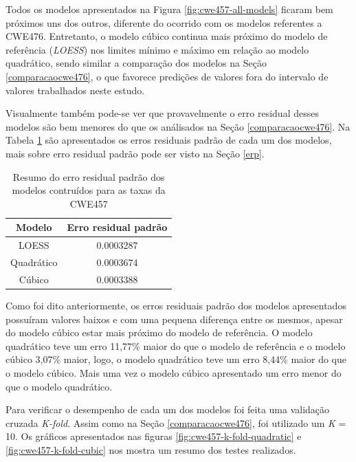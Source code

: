Todos os modelos apresentados na Figura \ref{fig:cwe457-all-models} ficaram bem
próximos uns dos outros, diferente do ocorrido com os modelos referentes a
CWE476. Entretanto, o modelo cúbico continua mais próximo do modelo de
referência (\textit{LOESS}) nos limites mínimo e máximo em relação ao modelo
quadrático, sendo similar a comparação dos modelos na Seção
\ref{comparacaocwe476}, o que favorece predições de valores fora do intervalo de
valores trabalhados neste estudo.

Visualmente também pode-se ver que provavelmente o erro residual desses modelos
são bem menores do que os análisados na Seção \ref{comparacaocwe476}. Na Tabela
\ref{tab:cwe457-erros} são apresentados os erros residuais padrão de cada um dos
modelos, mais sobre erro residual padrão pode ser visto na Seção \ref{erp}.

\begin{table}[h]
 \centering
 \begin{tabular}{cc}
  \hline
  \rowcolor[HTML]{EFEFEF} 
  {Modelo} & {Erro residual padrão} \\ \hline
  {LOESS}  & 0.0003287                  \\ \hline
  Quadrático   & 0.0003674                  \\ \hline
  Cúbico       & 0.0003388                 \\ \hline
 \end{tabular}
 \caption{Resumo do erro residual padrão dos modelos contruídos para as taxas da
 CWE457}
 \label{tab:cwe457-erros}
\end{table}

Como foi dito anteriormente, os erros residuais padrão dos modelos apresentados
possuíram valores baixos e com uma pequena diferença entre os mesmos, apesar do
modelo cúbico estar mais próximo do modelo de referência. O modelo quadrático
teve um erro 11,77\% maior do que o modelo de referência e o modelo cúbico
3,07\% maior, logo, o modelo quadrático teve um erro 8,44\% maior do que o
modelo cúbico. Mais uma vez o modelo cúbico apresentado um erro menor do que o
modelo quadrático.

Para verificar o desempenho de cada um dos modelos foi feita uma validação
cruzada \textit{K-fold}. Assim como na Seção \ref{comparacaocwe476}, foi
utilizado um \textit{K} = 10. Os gráficos apresentados nas figuras
\ref{fig:cwe457-k-fold-quadratic} e \ref{fig:cwe457-k-fold-cubic} nos mostra um
resumo dos testes realizados.

